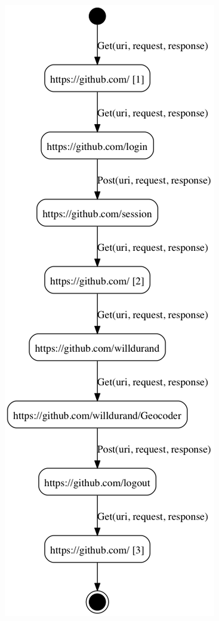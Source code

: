 
\begin{figure}[H]
\begin{minipage}{.5\textwidth}
    \includegraphics[width=0.8\linewidth]{figures/gh-iosts-1.png}


\end{minipage}
\end{figure}
